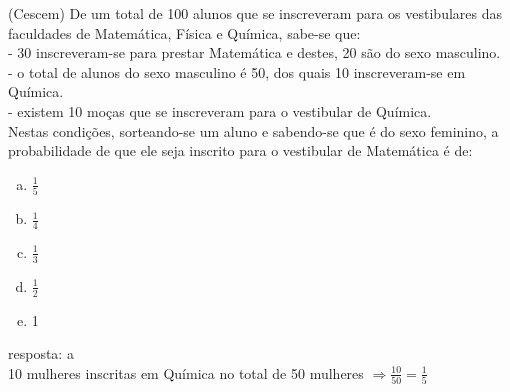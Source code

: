 \begin{ex}
 (Cescem) De um total de 100 alunos que se inscreveram para os vestibulares das faculdades de Matemática, Física e Química, sabe-se que:\\
- 30 inscreveram-se para prestar Matemática e destes, 20 são do sexo masculino.\\
- o total de alunos do sexo masculino é 50, dos quais 10 inscreveram-se em Química.\\
- existem 10 moças que se inscreveram para o vestibular de Química.\\
Nestas condições, sorteando-se um aluno e sabendo-se que é do sexo feminino, a probabilidade de que ele seja inscrito para o vestibular de Matemática é de:
    \begin{enumerate}[(a)]
    \item $\frac{1}{5}$
    \item $\frac{1}{4}$
    \item $\frac{1}{3}$
    \item $\frac{1}{2}$
    \item 1
    \end{enumerate}
      \begin{sol}
       resposta: a \\
       10 mulheres inscritas em Química no total de 50 mulheres $\Longrightarrow \frac{10}{50}=\frac{1}{5}$
      \end{sol}
\end{ex}